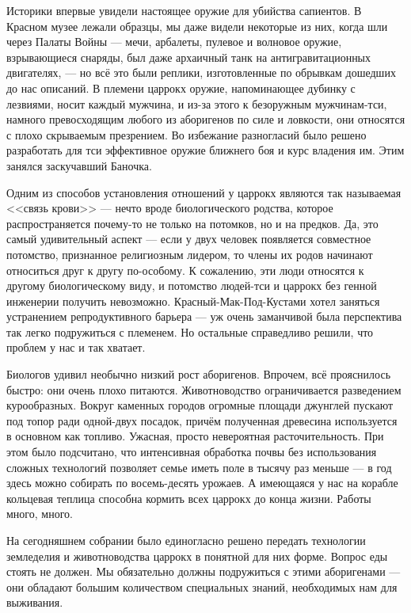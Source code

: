 Историки впервые увидели настоящее оружие для убийства сапиентов.
В Красном музее лежали образцы, мы даже видели некоторые из них, когда шли через Палаты Войны --- мечи, арбалеты, пулевое и волновое оружие, взрывающиеся снаряды, был даже архаичный танк на антигравитационных двигателях, --- но всё это были реплики, изготовленные по обрывкам дошедших до нас описаний.
В племени царрокх оружие, напоминающее дубинку с лезвиями, носит каждый мужчина, и из-за этого к безоружным мужчинам-тси, намного превосходящим любого из аборигенов по силе и ловкости, они относятся с плохо скрываемым презрением.
Во избежание разногласий было решено разработать для тси эффективное оружие ближнего боя и курс владения им.
Этим занялся заскучавший Баночка.

Одним из способов установления отношений у царрокх являются так называемая <<связь крови>> --- нечто вроде биологического родства, которое распространяется почему-то не только на потомков, но и на предков.
Да, это самый удивительный аспект --- если у двух человек появляется совместное потомство, признанное религиозным лидером, то члены их родов начинают относиться друг к другу по-особому.
К сожалению, эти люди относятся к другому биологическому виду, и потомство людей-тси и царрокх без генной инженерии получить невозможно.
Красный-Мак-Под-Кустами хотел заняться устранением репродуктивного барьера --- уж очень заманчивой была перспектива так легко подружиться с племенем.
Но остальные справедливо решили, что проблем у нас и так хватает.

Биологов удивил необычно низкий рост аборигенов.
Впрочем, всё прояснилось быстро: они очень плохо питаются.
Животноводство ограничивается разведением курообразных.
Вокруг каменных городов огромные площади джунглей пускают под топор ради одной-двух посадок, причём полученная древесина используется в основном как топливо.
Ужасная, просто невероятная расточительность.
При этом было подсчитано, что интенсивная обработка почвы без использования сложных технологий позволяет семье иметь поле в тысячу раз меньше --- в год здесь можно собирать по восемь-десять урожаев.
А имеющаяся у нас на корабле кольцевая теплица способна кормить всех царрокх до конца жизни.
Работы много, много.

На сегодняшнем собрании было единогласно решено передать технологии земледелия и животноводства царрокх в понятной для них форме.
Вопрос еды стоять не должен\FM.
Мы обязательно должны подружиться с этими аборигенами --- они обладают большим количеством специальных знаний, необходимых нам для выживания.

